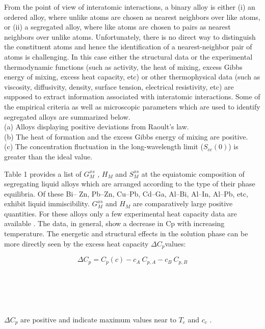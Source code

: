 \documentclass[12pt]{article}
\newcommand*{\1}{\hspace{1pt}}
\begin{document}
From the point of view of interatomic interactions, a binary alloy is either (i) an ordered
alloy, where unlike atoms are chosen as nearest neighbors over like atoms, or (ii) a
segregated alloy, where like atoms are chosen to pairs as nearest neighbors over unlike
atoms. Unfortunately, there is no direct way to distinguish the constituent atoms and
hence the identification of a nearest-neighbor pair of atoms is challenging. In this case
either the structural data or the experimental thermodynamic functions (such as activity, the heat of
mixing, excess Gibbs energy of mixing, excess heat capacity, etc) or other thermophysical
data (such as viscosity, diffusivity, density, surface tension, electrical resistivity, etc) are
supposed to extract information associated with interatomic interactions. Some of the
empirical criteria as well as microscopic parameters which are used to identify segregated
alloys are summarized below.\\
(a) Alloys displaying positive deviations from Raoult’s law.\\
(b) The heat of formation and the excess Gibbs energy of mixing are positive.\\
(c) The concentration fluctuation in the long-wavelength limit ($ S _{cc}(0) $) is greater than
    the ideal value.

    Table 1 provides a list of $G^{xs} _{M}$ , $H _M$ and $S^{xs} _{M}$ at the equiatomic composition 
of segregating liquid alloys which are arranged according to the type of their phase equilibria. Of these Bi–
Zn, Pb–Zn, Cu–Pb, Cd–Ga, Al–Bi, Al–In, Al–Pb, etc, exhibit liquid immiscibility. $G^{xs} _{M}$ and
$ H _M $ are comparatively large positive quantities. For these alloys only a few experimental
heat capacity data are available . The data, in general, show a decrease in Cp with increasing temperature. The energetic and structural effects in the
solution phase can be more directly seen by the excess heat capacity $\Delta  C _p $values:

    \begin{equation}
        \Delta  C _p = C_p(c) - c_A \ C_{p,A} - c_B \ C_{p,B} 
    \end{equation} 
    \\
    \\
    \\
    \\
    \\
    
$\Delta  C _p $ are positive and indicate maximum values near to $ T _c$ and $c _c$ . 
 
\end{document}
